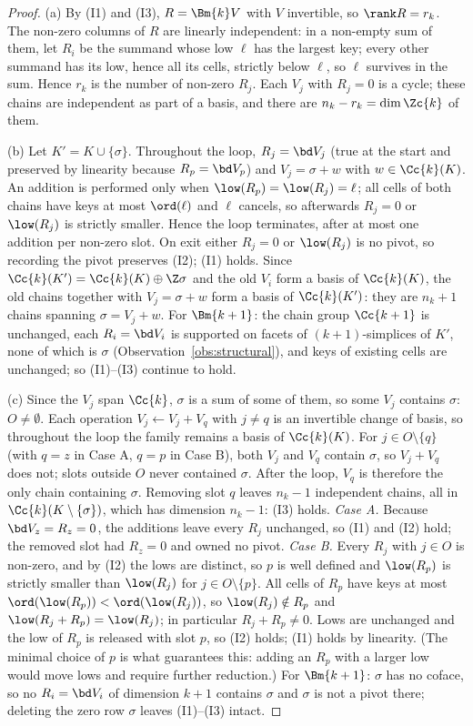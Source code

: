 \begin{proof}
(a) By (I1) and (I3), $R=\Bm{k}V$ with $V$ invertible, so $\rank R=r_k$. The
non-zero columns of $R$ are linearly independent: in a non-empty sum of them,
let $R_i$ be the summand whose low $\ell$ has the largest key; every other
summand has its low, hence all its cells, strictly below $\ell$, so $\ell$
survives in the sum. Hence $r_k$ is the number of non-zero $R_j$. Each $V_j$ with
$R_j=0$ is a cycle; these chains are independent as part of a basis, and there
are $n_k-r_k=\dim\Zc{k}$ of them.

(b) Let $K'=K\cup\{\sigma\}$. Throughout the loop, $R_j=\bd V_j$ (true at the
start and preserved by linearity because $R_p=\bd V_p$) and $V_j=\sigma+w$ with
$w\in\Cc{k}(K)$. An addition is performed only when $\low(R_p)=\low(R_j)=\ell$;
all cells of both chains have keys at most $\ord(\ell)$ and $\ell$ cancels, so
afterwards $R_j=0$ or $\low(R_j)$ is strictly smaller. Hence the loop
terminates, after at most one addition per non-zero slot. On exit either
$R_j=0$ or $\low(R_j)$ is no pivot, so recording the pivot preserves (I2); (I1)
holds. Since $\Cc{k}(K')=\Cc{k}(K)\oplus\Z\sigma$ and the old $V_i$ form a basis
of $\Cc{k}(K)$, the old chains together with $V_j=\sigma+w$ form a basis of
$\Cc{k}(K')$: they are $n_k+1$ chains spanning $\sigma=V_j+w$. For $\Bm{k+1}$:
the chain group $\Cc{k+1}$ is unchanged, each $R_i=\bd V_i$ is supported on facets
of $(k+1)$-simplices of $K'$, none of which is $\sigma$
(Observation~\ref{obs:structural}), and keys of existing cells are unchanged;
so (I1)--(I3) continue to hold.

(c) Since the $V_j$ span $\Cc{k}$, $\sigma$ is a sum of some of them, so some
$V_j$ contains $\sigma$: $O\ne\emptyset$. Each operation $V_j\gets V_j+V_q$ with
$j\ne q$ is an invertible change of basis, so throughout the loop the family
remains a basis of $\Cc{k}(K)$. For $j\in O\setminus\{q\}$ (with $q=z$ in Case A,
$q=p$ in Case B), both $V_j$ and $V_q$ contain $\sigma$, so $V_j+V_q$ does not;
slots outside $O$ never contained $\sigma$. After the loop, $V_q$ is therefore
the only chain containing $\sigma$. Removing slot $q$ leaves $n_k-1$ independent
chains, all in $\Cc{k}(K\setminus\{\sigma\})$, which has dimension $n_k-1$:
(I3) holds.
\emph{Case A.} Because $\bd V_z=R_z=0$, the additions leave every $R_j$
unchanged, so (I1) and (I2) hold; the removed slot had $R_z=0$ and owned no
pivot.
\emph{Case B.} Every $R_j$ with $j\in O$ is non-zero, and by (I2) the lows are
distinct, so $p$ is well defined and $\low(R_p)$ is strictly smaller than
$\low(R_j)$ for $j\in O\setminus\{p\}$. All cells of $R_p$ have keys at most
$\ord(\low(R_p))<\ord(\low(R_j))$, so $\low(R_j)\notin R_p$ and
$\low(R_j+R_p)=\low(R_j)$; in particular $R_j+R_p\ne0$. Lows are unchanged and
the low of $R_p$ is released with slot $p$, so (I2) holds; (I1) holds by
linearity. (The minimal choice of $p$ is what guarantees this: adding an $R_p$
with a larger low would move lows and require further reduction.)
For $\Bm{k+1}$: $\sigma$ has no coface, so no $R_i=\bd V_i$ of dimension $k+1$
contains $\sigma$ and $\sigma$ is not a pivot there; deleting the zero row
$\sigma$ leaves (I1)--(I3) intact.


\end{proof}
